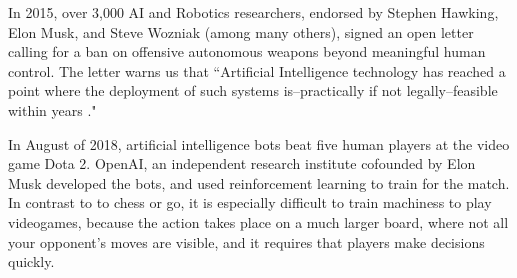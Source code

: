 In 2015, over 3,000 AI and Robotics researchers, endorsed by Stephen Hawking, Elon Musk, and Steve Wozniak (among many others), signed an open letter calling for a ban on offensive autonomous weapons beyond meaningful human control. The letter warns us that ``Artificial Intelligence technology has reached a point where the deployment of such systems is--practically if not legally--feasible within years \cite{hawking2015autonomous}."

In August of 2018, artificial intelligence bots beat five human players at the video game Dota 2. OpenAI, an independent research institute cofounded by Elon Musk developed the bots, and used reinforcement learning to train for the match. In contrast to to chess or go, it is especially difficult to train machiness to play videogames, because the action takes place on a much larger board, where not all your opponent's moves are visible, and it requires that players make decisions quickly. 






